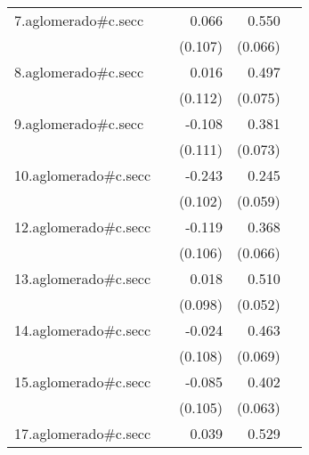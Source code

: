 {\begin{longtable}{l*{4}{D{.}{.}{-1}}}
\addlinespace
7.aglomerado#c.secc&                     &       0.066         &       0.550\sym{***}&                     \\
            &                     &     (0.107)         &     (0.066)         &                     \\
\addlinespace
8.aglomerado#c.secc&                     &       0.016         &       0.497\sym{***}&                     \\
            &                     &     (0.112)         &     (0.075)         &                     \\
\addlinespace
9.aglomerado#c.secc&                     &      -0.108         &       0.381\sym{***}&                     \\
            &                     &     (0.111)         &     (0.073)         &                     \\
\addlinespace
10.aglomerado#c.secc&                     &      -0.243\sym{*}  &       0.245\sym{***}&                     \\
            &                     &     (0.102)         &     (0.059)         &                     \\
\addlinespace
12.aglomerado#c.secc&                     &      -0.119         &       0.368\sym{***}&                     \\
            &                     &     (0.106)         &     (0.066)         &                     \\
\addlinespace
13.aglomerado#c.secc&                     &       0.018         &       0.510\sym{***}&                     \\
            &                     &     (0.098)         &     (0.052)         &                     \\
\addlinespace
14.aglomerado#c.secc&                     &      -0.024         &       0.463\sym{***}&                     \\
            &                     &     (0.108)         &     (0.069)         &                     \\
\addlinespace
15.aglomerado#c.secc&                     &      -0.085         &       0.402\sym{***}&                     \\
            &                     &     (0.105)         &     (0.063)         &                     \\
\addlinespace
17.aglomerado#c.secc&                     &       0.039         &       0.529\sym{***}&                     \\

\end{longtable}}
